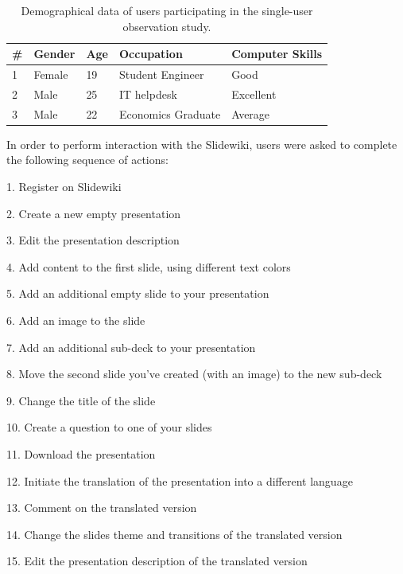 \documentclass[ngerman,UKenglish,table]{scrbook}
\begin{document}
\begin{table}[!h]
\centering

\begin{tabularx}{0.7\columnwidth}{l l l l l }    
    \toprule
    
    \textbf{\#} &\textbf{Gender} & \textbf{Age} & \textbf{Occupation} & \textbf{Computer Skills}\\
    \midrule
    
   1 & Female & 19 & Student Engineer & Good \\
	\midrule
	
    2 &  Male & 25 & IT helpdesk & Excellent \\
    \midrule
   
    3 &  Male & 22 & Economics Graduate & Average\\
    
	\bottomrule
    \end{tabularx}
\caption{Demographical data of users participating in the single-user observation study.}
\label{tab:single_user_demo}
\end{table}

In order to perform interaction with the Slidewiki, users were asked to complete the following sequence of actions:


1. Register on Slidewiki

2. Create a new empty presentation

3. Edit the presentation description

4. Add content to the first slide, using different text colors

5. Add an additional empty slide to your presentation

6. Add an image to the slide

7. Add an additional sub-deck to your presentation

8. Move the second slide you've created (with an image) to the new sub-deck

9. Change the title of the slide

10. Create a question to one of your slides

11. Download the presentation

12. Initiate the translation of the presentation into a different language 

13. Comment on the translated version

14. Change the slides theme and transitions of the translated version

15. Edit the presentation description of the translated version
\end{document}

